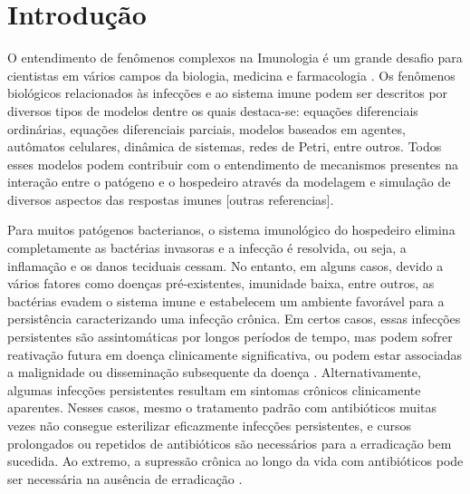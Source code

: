 \documentclass[10pt]{bmc_article}
\newenvironment{bmcformat}{\baselineskip20pt\sloppy\setboolean{publ}{false}}{\baselineskip20pt\sloppy}
\begin{document}
\begin{bmcformat}




\section*{Introdução}

O entendimento de fenômenos complexos na Imunologia é um grande desafio para cientistas em vários campos 
		da biologia, medicina e farmacologia \cite{Carvalho2015}. Os fenômenos biológicos relacionados às infecções e ao sistema imune 
		podem ser descritos por diversos tipos de modelos dentre os quais destaca-se: equações diferenciais ordinárias, 
		equações diferenciais parciais, modelos baseados em agentes, autômatos celulares, dinâmica de sistemas, 
		redes de Petri, entre outros. Todos esses modelos podem contribuir com o entendimento de mecanismos presentes 
		na interação entre o patógeno e o hospedeiro através da modelagem e simulação de diversos aspectos das 
		respostas imunes \cite{Carvalho2015} [outras referencias].  
		
		Para muitos patógenos bacterianos, o sistema imunológico do hospedeiro elimina completamente as bactérias invasoras 
		e a infecção é resolvida, ou seja, a inflamação e os danos teciduais cessam. No entanto, em alguns casos, devido 
		a vários fatores como doenças pré-existentes, imunidade baixa, entre outros, as bactérias evadem o sistema imune 
		e estabelecem um ambiente favorável para a persistência caracterizando uma infecção crônica. 
		Em certos casos, essas infecções persistentes são assintomáticas 
		por longos períodos de tempo, mas podem sofrer reativação futura em doença clinicamente significativa, ou podem estar 
		associadas a malignidade ou disseminação subsequente da doença \cite{Grant2013}. Alternativamente, algumas infecções persistentes 
		resultam em sintomas crônicos clinicamente aparentes. Nesses casos, mesmo o tratamento padrão com antibióticos muitas 
		vezes não consegue esterilizar eficazmente infecções persistentes, e cursos prolongados ou repetidos de antibióticos 
		são necessários para a erradicação bem sucedida. Ao extremo, a supressão crônica ao longo da vida com antibióticos 
		pode ser necessária na ausência de erradicação \cite{Grant2013}.		
		

\end{bmcformat}
\end{document}
